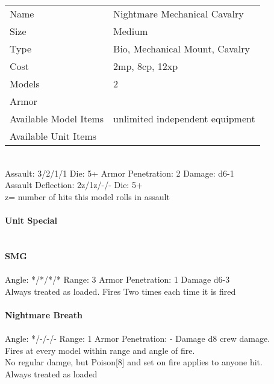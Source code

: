 \begin{tabular}{ll}
  Name & Nightmare Mechanical Cavalry \\
  Size & Medium\\
  Type & Bio, Mechanical Mount, Cavalry\\
  Cost & 2mp, 8cp, 12xp\\
  Models & 2\\
  Armor & \\
  Available Model Items & unlimited independent equipment \\
  Available Unit Items &  \\
\end{tabular}

\ \\
Assault: 3/2/1/1 Die: 5+ Armor Penetration: 2 Damage: d6-1 \\
Assault Deflection: 2z/1z/-/- Die: 5+\\
\indent z= number of hits this model rolls in assault \\
\ \\

{\bf Unit Special} \\

\ \\
\ \\
{\bf SMG } \\
\ \\
Angle: */*/*/* Range: 3 Armor Penetration: 1 Damage d6-3 \\
\indent Always treated as loaded. Fires Two times each time it is fired \\



\ \\
{\bf Nightmare Breath } \\
\ \\
Angle: */-/-/- Range: 1 Armor Penetration: - Damage d8 crew damage. \\
\indent Fires at every model within range and angle of fire. \\ No regular damge, but Poison[8] and set on fire applies to anyone hit.\\ Always treated as loaded \\





